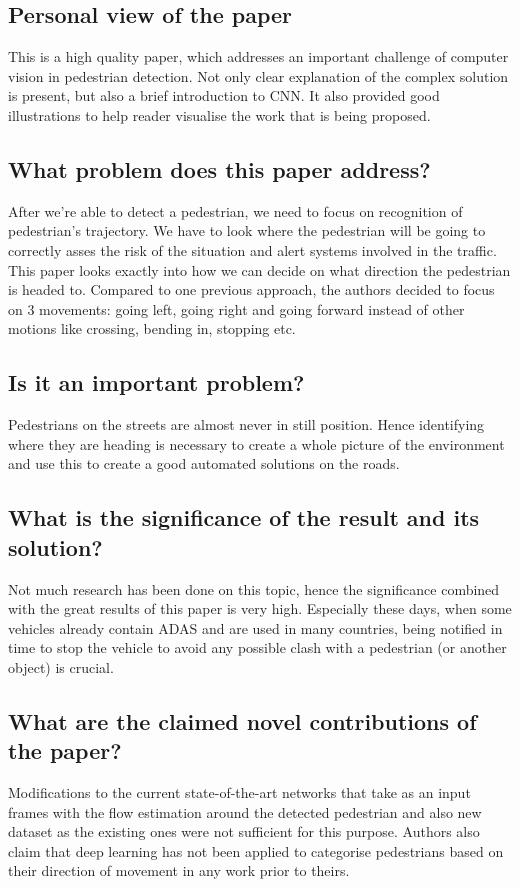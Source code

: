 \documentclass[11pt,a4paper]{article}
\begin{document}
\subsection*{Personal view of the paper}
This is a high quality paper, which addresses an important challenge of computer vision in pedestrian detection. Not only clear explanation of the complex solution is present, but also a brief introduction to CNN. It also provided good illustrations to help reader visualise the work that is being proposed.

\subsection*{What problem does this paper address?}
After we’re able to detect a pedestrian, we need to focus on recognition of pedestrian’s trajectory. We have to look where the pedestrian will be going to correctly asses the risk of the situation and alert systems involved in the traffic. This paper looks exactly into how we can decide on what direction the pedestrian is headed to. Compared to one previous approach, the authors decided to focus on 3 movements: going left, going right and going forward instead of other motions like crossing, bending in, stopping etc.

\subsection*{Is it an important problem?}
Pedestrians on the streets are almost never in still position. Hence identifying where they are heading is necessary to create a whole picture of the environment and use this to create a good automated solutions on the roads.

\subsection*{What is the significance of the result and its solution?}
Not much research has been done on this topic, hence the significance combined with the great results of this paper is very high. Especially these days, when some vehicles already contain ADAS and are used in many countries, being notified in time to stop the vehicle to avoid any possible clash with a pedestrian (or another object) is crucial.

\subsection*{What are the claimed novel contributions of the paper?}
Modifications to the current state-of-the-art networks that take as an input frames with the flow estimation around the detected pedestrian and also new dataset as the existing ones were not sufficient for this purpose. Authors also claim that deep learning has not been applied to categorise pedestrians based on their direction of movement in any work prior to theirs.
\end{document}
